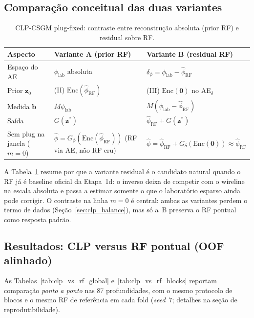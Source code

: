 \documentclass[11pt,a4paper]{article}
\newcommand{\deltaphi}{\ensuremath{\delta_{\phi}}}
\newcommand{\zvec}{\ensuremath{\mathbf{z}}}
\newcommand{\zzero}{\ensuremath{\mathbf{z}_0}}
\begin{document}
\subsection{Comparação conceitual das duas variantes}

\begin{table}[H]
  \centering
  \caption{CLP-CSGM plug-fixed: contraste entre reconstrução absoluta
           (prior RF) e residual sobre RF.}
  \label{tab:clp_formulations}
  \small
  \begin{tabular}{p{3.2cm}p{5.2cm}p{5.2cm}}
    \toprule
    Aspecto & Variante A (prior RF) & Variante B (residual RF) \\
    \midrule
    Espaço do AE &
      $\phi_{\mathrm{lab}}$ absoluta &
      $\deltaphi=\phi_{\mathrm{lab}}-\widehat{\phi}_{\mathrm{RF}}$ \\
    Prior $\zzero$ &
      (II) $\mathrm{Enc}(\widehat{\phi}_{\mathrm{RF}})$ &
      (III) $\mathrm{Enc}(\mathbf{0})$ no AE$_{\delta}$ \\
    Medida $\mathbf{b}$ &
      $M\phi_{\mathrm{lab}}$ &
      $M(\phi_{\mathrm{lab}}-\widehat{\phi}_{\mathrm{RF}})$ \\
    Saída &
      $G(\zvec^{\ast})$ &
      $\widehat{\phi}_{\mathrm{RF}}+G(\zvec^{\ast})$ \\
    Sem plug na janela ($m=0$) &
      $\widehat{\phi}=G_{\phi}(\mathrm{Enc}(\widehat{\phi}_{\mathrm{RF}}))$
      (RF via AE, não RF cru) &
      $\widehat{\phi}=\widehat{\phi}_{\mathrm{RF}}+G_{\delta}(\mathrm{Enc}(\mathbf{0}))
      \approx\widehat{\phi}_{\mathrm{RF}}$ \\
    \bottomrule
  \end{tabular}
\end{table}

A Tabela~\ref{tab:clp_formulations} resume por que a variante residual
é o candidato natural quando o RF já é baseline oficial da Etapa~1d: o
inverso deixa de competir com o wireline na escala absoluta e passa a
estimar somente o que o laboratório esparso ainda pode corrigir.
O contraste na linha $m=0$ é central: ambas as variantes perdem o termo
de dados (Seção~\ref{sec:clp_balance}), mas só a~B preserva o RF
pontual como resposta padrão.

\subsection{Resultados: CLP versus RF pontual (OOF alinhado)}

As Tabelas~\ref{tab:clp_vs_rf_global} e~\ref{tab:clp_vs_rf_blocks}
reportam comparação \emph{ponto a ponto} nas 87 profundidades, com o
mesmo protocolo de blocos e o mesmo RF de referência em cada fold
(\emph{seed}~7; detalhes na seção de reprodutibilidade).
\end{document}
